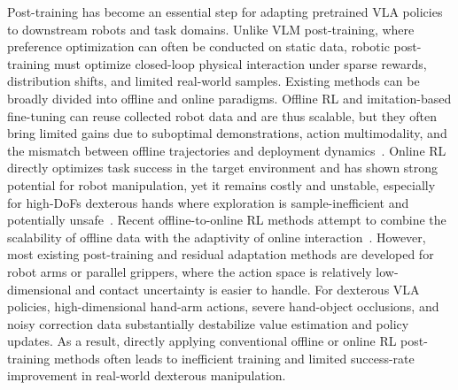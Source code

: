 \documentclass{article}
\begin{document}
Post-training has become an essential step for adapting pretrained VLA policies to downstream robots and task domains. Unlike VLM post-training, where preference optimization can often be conducted on static data, robotic post-training must optimize closed-loop physical interaction under sparse rewards, distribution shifts, and limited real-world samples. Existing methods can be broadly divided into offline and online paradigms. Offline RL and imitation-based fine-tuning can reuse collected robot data and are thus scalable, but they often bring limited gains due to suboptimal demonstrations, action multimodality, and the mismatch between offline trajectories and deployment dynamics~\cite{huang2025co}. Online RL directly optimizes task success in the target environment and has shown strong potential for robot manipulation, yet it remains costly and unstable, especially for high-DoFs dexterous hands where exploration is sample-inefficient and potentially unsafe~\cite{chen2025conrft,xu2026rl,chen2025pirl}. Recent offline-to-online RL methods attempt to combine the scalability of offline data with the adaptivity of online interaction~\cite{nakamoto2023cal,ball2023efficient}. However, most existing post-training and residual adaptation methods are developed for robot arms or parallel grippers, where the action space is relatively low-dimensional and contact uncertainty is easier to handle. For dexterous VLA policies, high-dimensional hand-arm actions, severe hand-object occlusions, and noisy correction data substantially destabilize value estimation and policy updates. As a result, directly applying conventional offline or online RL post-training methods often leads to inefficient training and limited success-rate improvement in real-world dexterous manipulation.
\end{document}
